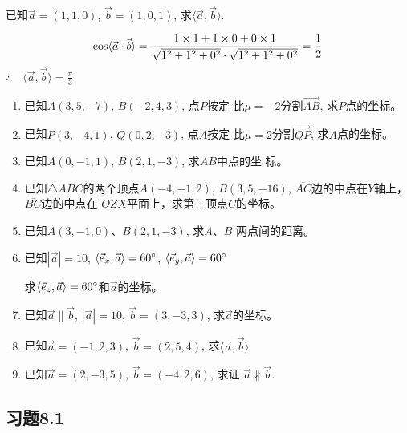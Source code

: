 \begin{example}
    已知$\vec{a}=(1,1,0)$, $\vec{b}=(1,0,1)$, 
求$\langle \vec{a},\vec{b}\rangle$.
\end{example}

\begin{solution}
\[\cos\langle \vec{a}\cdot \vec{b} \rangle=\dfrac{1\times 1+1\times 0+0\times 1}{\sqrt{1^2+1^2+0^2}\cdot \sqrt{1^2+1^2+0^2}}=\dfrac{1}{2} \]
$\therefore\quad \langle \vec{a},\vec{b}\rangle=\frac{\pi}{3}$    
\end{solution}

\begin{ex}
\begin{enumerate}
    \item 已知$A(3,5,-7)$, $B(-2,4,3)$, 点$P$按定
    比$\mu=-2$分割$\Vec{AB}$, 求$P$点的坐标。
    \item 已知$P(3,-4,1)$, $Q(0,2,-3)$, 点$A$按定
    比$\mu=2$分割$\Vec{QP}$, 求$A$点的坐标。
    \item 已知$A(0,-1,1)$, $B(2,1,-3)$, 求$\overline{AB}$中点的坐
    标。
    \item 已知$\triangle ABC$的两个顶点$A(-4,-1,2)$, $B(3,
    5,-16)$, $\overline{AC}$边的中点在$Y$轴上，
    $\overline{BC}$边的中点在
    $OZX$平面上，求第三顶点$C$的坐标。
    \item 已知$A(3,-1,0)$、$B(2,1,-3)$, 求$A$、$B$
    两点间的距离。
    \item 已知$|\vec{a}|=10$, $\langle \vec{e}_x,\vec{a} \rangle=60^{\circ}$, $\langle \vec{e}_y,\vec{a} \rangle=60^{\circ}$

    求$\langle \vec{e}_z,\vec{a} \rangle=60^{\circ}$和$\vec{a}$的坐标。
\item 已知$\vec{a}\parallel \vec{b}$, $|\vec{a}|=10$, $\vec{b}=(3,-3,3)$, 求$\vec{a}$的坐标。

\item 已知$\vec{a}=(-1,2,3)$, $\vec{b}=(2,5,4)$, 求$\langle \vec{a},\vec{b} \rangle$

\item 已知$\vec{a}=(2,-3,5)$, $\vec{b}=(-4,2,6)$, 求证
$\vec{a}\nparallel \vec{b}$.
\end{enumerate}
\end{ex}

\subsection{习题8.1}


